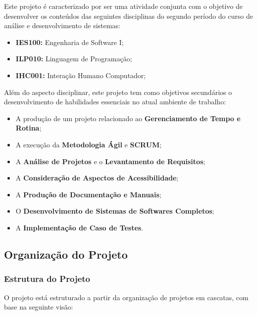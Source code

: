 \documentclass[a4paper,12pt]{article}
\begin{document}
Este projeto é caracterizado por ser uma atividade conjunta com o objetivo de desenvolver os conteúdos das seguintes 
disciplinas do segundo período do curso de análise e desenvolvimento de sistemas:
\begin{itemize}
    \item \textbf{IES100:} Engenharia de Software I;
    \item \textbf{ILP010:} Linguagem de Programação;
    \item \textbf{IHC001:} Interação Humano Computador;
\end{itemize}

Além do aspecto disciplinar, este projeto tem como objetivos secundários o desenvolvimento de habilidades essenciais no 
atual ambiente de trabalho:
\begin{itemize}
    \item A produção de um projeto relacionado ao \textbf{Gerenciamento de Tempo e Rotina};
    \item A execução da \textbf{Metodologia Ágil} e \textbf{SCRUM};
    \item A \textbf{Análise de Projetos} e o \textbf{Levantamento de Requisitos};
    \item A \textbf{Consideração de Aspectos de Acessibilidade};
    \item A \textbf{Produção de Documentação e Manuais};
    \item O \textbf{Desenvolvimento de Sistemas de Softwares Completos};
    \item A \textbf{Implementação de Caso de Testes}.
\end{itemize}

\subsection{Organização do Projeto}
\subsubsection{Estrutura do Projeto}
O projeto está estruturado a partir da organização de projetos em cascatas, com base na seguinte visão:
\end{document}
